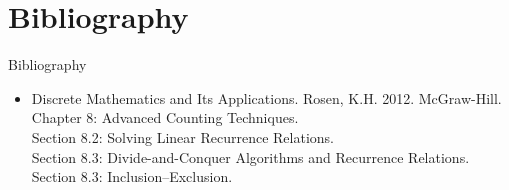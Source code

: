\documentclass{beamer}
\begin{document}
\section*{Bibliography}

\begin{frame}{Bibliography}
    \begin{itemize}
        \item Discrete Mathematics and Its Applications. Rosen, K.H. 2012. McGraw-Hill. \\
        Chapter 8: Advanced Counting Techniques. \\
        Section 8.2: Solving Linear Recurrence Relations. \\
        Section 8.3: Divide-and-Conquer Algorithms and Recurrence Relations. \\
        Section 8.3: Inclusion–Exclusion. 
    \end{itemize}
\end{frame}
\end{document}

